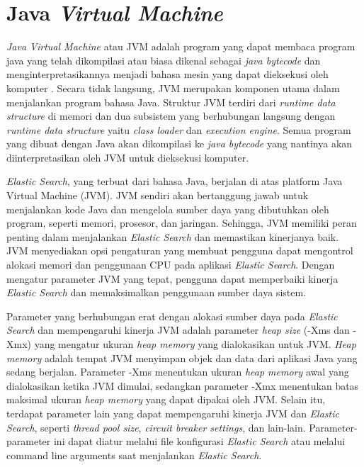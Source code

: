 \section{Java \textit{Virtual Machine}}
\textit{Java Virtual Machine} atau JVM adalah program yang dapat membaca program java yang telah dikompilasi atau biasa dikenal sebagai \textit{java bytecode} dan menginterpretasikannya menjadi bahasa mesin yang dapat dieksekusi oleh komputer \parencite{java12}. Secara tidak langsung, JVM merupakan komponen utama dalam menjalankan program bahasa Java. Struktur JVM terdiri dari \textit{runtime data structure} di memori dan dua subsistem yang berhubungan langsung dengan \textit{runtime data structure} yaitu \textit{class loader} dan \textit{execution engine}. Semua program yang dibuat dengan Java akan dikompilasi ke \textit{java bytecode} yang nantinya akan diinterpretasikan oleh JVM untuk dieksekusi komputer.

\textit{Elastic Search}, yang terbuat dari bahasa Java, berjalan di atas platform Java Virtual Machine (JVM). JVM sendiri akan bertanggung jawab untuk menjalankan kode Java dan mengelola sumber daya yang dibutuhkan oleh program, seperti memori, prosesor, dan jaringan. Sehingga, JVM memiliki peran penting dalam menjalankan \textit{Elastic Search} dan memastikan kinerjanya baik. JVM menyediakan opsi pengaturan yang membuat pengguna dapat mengontrol alokasi memori dan penggunaan CPU pada aplikasi \textit{Elastic Search}. Dengan mengatur parameter JVM yang tepat, pengguna dapat memperbaiki kinerja \textit{Elastic Search} dan memaksimalkan penggunaan sumber daya sistem.

Parameter yang berhubungan erat dengan alokasi sumber daya pada \textit{Elastic Search} dan mempengaruhi kinerja JVM adalah parameter \textit{heap size} (-Xms dan -Xmx) yang mengatur ukuran \textit{heap memory} yang dialokasikan untuk JVM. \textit{Heap memory} adalah tempat JVM menyimpan objek dan data dari aplikasi Java yang sedang berjalan. Parameter -Xms menentukan ukuran \textit{heap memory} awal yang dialokasikan ketika JVM dimulai, sedangkan parameter -Xmx menentukan batas maksimal ukuran \textit{heap memory} yang dapat dipakai oleh JVM. Selain itu, terdapat parameter lain yang dapat mempengaruhi kinerja JVM dan \textit{Elastic Search}, seperti \textit{thread pool size}, \textit{circuit breaker settings}, dan lain-lain. Parameter-parameter ini dapat diatur melalui file konfigurasi \textit{Elastic Search} atau melalui command line arguments saat menjalankan \textit{Elastic Search}.